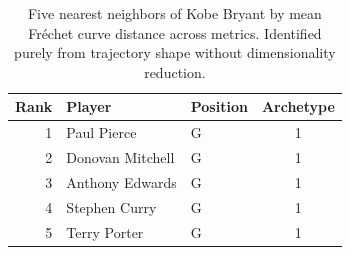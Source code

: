 \begin{table}[htbp]
  \centering\small
  \begin{tabular}{rllc}
    \toprule
    Rank & Player & Position & Archetype \\
    \midrule
    1 & Paul Pierce & G & 1 \\
    2 & Donovan Mitchell & G & 1 \\
    3 & Anthony Edwards & G & 1 \\
    4 & Stephen Curry & G & 1 \\
    5 & Terry Porter & G & 1 \\
    \bottomrule
  \end{tabular}
  \caption{Five nearest neighbors of Kobe Bryant by mean Fr\'{e}chet curve distance across metrics. Identified purely from trajectory shape without dimensionality reduction.}
  \label{tab:Kobe_Bryant_frechet_curve_neighbors}
\end{table}

